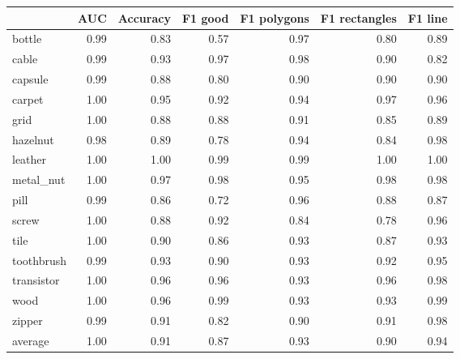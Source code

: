 \begin{tabular}{lrrrrrr}
\toprule
{} &  AUC &  Accuracy &  F1 good &  F1 polygons &  F1 rectangles &  F1 line \\
\midrule
bottle     & 0.99 &      0.83 &     0.57 &         0.97 &           0.80 &     0.89 \\
cable      & 0.99 &      0.93 &     0.97 &         0.98 &           0.90 &     0.82 \\
capsule    & 0.99 &      0.88 &     0.80 &         0.90 &           0.90 &     0.90 \\
carpet     & 1.00 &      0.95 &     0.92 &         0.94 &           0.97 &     0.96 \\
grid       & 1.00 &      0.88 &     0.88 &         0.91 &           0.85 &     0.89 \\
hazelnut   & 0.98 &      0.89 &     0.78 &         0.94 &           0.84 &     0.98 \\
leather    & 1.00 &      1.00 &     0.99 &         0.99 &           1.00 &     1.00 \\
metal\_nut  & 1.00 &      0.97 &     0.98 &         0.95 &           0.98 &     0.98 \\
pill       & 0.99 &      0.86 &     0.72 &         0.96 &           0.88 &     0.87 \\
screw      & 1.00 &      0.88 &     0.92 &         0.84 &           0.78 &     0.96 \\
tile       & 1.00 &      0.90 &     0.86 &         0.93 &           0.87 &     0.93 \\
toothbrush & 0.99 &      0.93 &     0.90 &         0.93 &           0.92 &     0.95 \\
transistor & 1.00 &      0.96 &     0.96 &         0.93 &           0.96 &     0.98 \\
wood       & 1.00 &      0.96 &     0.99 &         0.93 &           0.93 &     0.99 \\
zipper     & 0.99 &      0.91 &     0.82 &         0.90 &           0.91 &     0.98 \\
average    & 1.00 &      0.91 &     0.87 &         0.93 &           0.90 &     0.94 \\
\bottomrule
\end{tabular}
